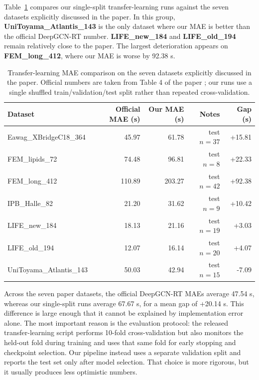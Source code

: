 Table~\ref{tab:transfer-seven} compares our single-split transfer-learning runs against the seven datasets explicitly discussed in the paper. In this group, \textbf{UniToyama\_Atlantis\_143} is the only dataset where our MAE is better than the official DeepGCN-RT number. \textbf{LIFE\_new\_184} and \textbf{LIFE\_old\_194} remain relatively close to the paper. The largest deterioration appears on \textbf{FEM\_long\_412}, where our MAE is worse by 92.38 s.

\begin{table}[t]
    \centering
    \caption{Transfer-learning MAE comparison on the seven datasets explicitly discussed in the paper. Official numbers are taken from Table 4 of the paper \cite{kang2023deepgcnrt}; our runs use a single shuffled train/validation/test split rather than repeated cross-validation.}
    \label{tab:transfer-seven}
    \begin{tabular}{lrrrr}
        \toprule
        Dataset                  & Official MAE (s) & Our MAE (s) & Notes         & Gap (s) \\
        \midrule
        Eawag\_XBridgeC18\_364   & 45.97            & 61.78       & test \(n=37\) & +15.81  \\
        FEM\_lipids\_72          & 74.48            & 96.81       & test \(n=8\)  & +22.33  \\
        FEM\_long\_412           & 110.89           & 203.27      & test \(n=42\) & +92.38  \\
        IPB\_Halle\_82           & 21.20            & 31.62       & test \(n=9\)  & +10.42  \\
        LIFE\_new\_184           & 18.13            & 21.16       & test \(n=19\) & +3.03   \\
        LIFE\_old\_194           & 12.07            & 16.14       & test \(n=20\) & +4.07   \\
        UniToyama\_Atlantis\_143 & 50.03            & 42.94       & test \(n=15\) & -7.09   \\
        \bottomrule
    \end{tabular}
\end{table}

Across the seven paper datasets, the official DeepGCN-RT MAEs average 47.54 s, whereas our single-split runs average 67.67 s, for a mean gap of +20.14 s. This difference is large enough that it cannot be explained by implementation error alone. The most important reason is the evaluation protocol: the released transfer-learning script performs 10-fold cross-validation but also monitors the held-out fold during training and uses that same fold for early stopping and checkpoint selection. Our pipeline instead uses a separate validation split and reports the test set only after model selection. That choice is more rigorous, but it usually produces less optimistic numbers.

